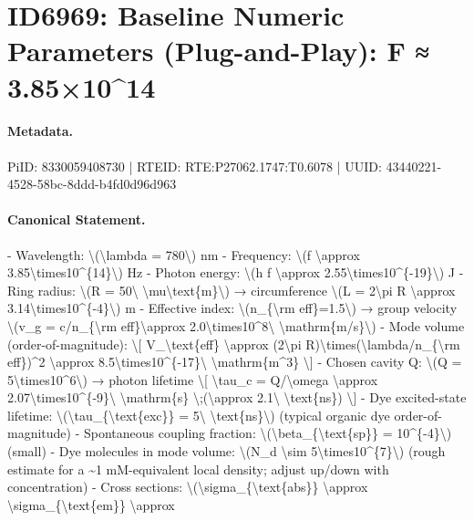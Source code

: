 \section*{ID6969: Baseline Numeric Parameters (Plug-and-Play): F ≈ 3.85×10\textasciicircum{}14}
\paragraph{Metadata.}
PiID: 8330059408730 | RTEID: RTE:P27062.1747:T0.6078 | UUID: 43440221-4528-58bc-8ddd-b4fd0d96d963

\paragraph{Canonical Statement.}
- Wavelength: \textbackslash{}(\textbackslash{}lambda = 780\textbackslash{}) nm - Frequency: \textbackslash{}(f \textbackslash{}approx 3.85\textbackslash{}times10\textasciicircum{}\{14\}\textbackslash{}) Hz - Photon energy: \textbackslash{}(h f \textbackslash{}approx 2.55\textbackslash{}times10\textasciicircum{}\{-19\}\textbackslash{}) J - Ring radius: \textbackslash{}(R = 50\textbackslash{} \textbackslash{}mu\textbackslash{}text\{m\}\textbackslash{}) → circumference \textbackslash{}(L = 2\textbackslash{}pi R \textbackslash{}approx 3.14\textbackslash{}times10\textasciicircum{}\{-4\}\textbackslash{}) m - Effective index: \textbackslash{}(n\_\{\textbackslash{}rm eff\}=1.5\textbackslash{}) → group velocity \textbackslash{}(v\_g = c/n\_\{\textbackslash{}rm eff\}\textbackslash{}approx 2.0\textbackslash{}times10\textasciicircum{}8\textbackslash{} \textbackslash{}mathrm\{m/s\}\textbackslash{}) - Mode volume (order-of-magnitude): \textbackslash{}[ V\_\textbackslash{}text\{eff\} \textbackslash{}approx (2\textbackslash{}pi R)\textbackslash{}times(\textbackslash{}lambda/n\_\{\textbackslash{}rm eff\})\textasciicircum{}2 \textbackslash{}approx 8.5\textbackslash{}times10\textasciicircum{}\{-17\}\textbackslash{} \textbackslash{}mathrm\{m\textasciicircum{}3\} \textbackslash{}] - Chosen cavity Q: \textbackslash{}(Q = 5\textbackslash{}times10\textasciicircum{}6\textbackslash{}) → photon lifetime \textbackslash{}[ \textbackslash{}tau\_c = Q/\textbackslash{}omega \textbackslash{}approx 2.07\textbackslash{}times10\textasciicircum{}\{-9\}\textbackslash{} \textbackslash{}mathrm\{s\} \textbackslash{};(\textbackslash{}approx 2.1\textbackslash{} \textbackslash{}text\{ns\}) \textbackslash{}] - Dye excited-state lifetime: \textbackslash{}(\textbackslash{}tau\_\{\textbackslash{}text\{exc\}\} = 5\textbackslash{} \textbackslash{}text\{ns\}\textbackslash{}) (typical organic dye order-of-magnitude) - Spontaneous coupling fraction: \textbackslash{}(\textbackslash{}beta\_\{\textbackslash{}text\{sp\}\} = 10\textasciicircum{}\{-4\}\textbackslash{}) (small) - Dye molecules in mode volume: \textbackslash{}(N\_d \textbackslash{}sim 5\textbackslash{}times10\textasciicircum{}\{7\}\textbackslash{}) (rough estimate for a \textasciitilde{}1 mM-equivalent local density; adjust up/down with concentration) - Cross sections: \textbackslash{}(\textbackslash{}sigma\_\{\textbackslash{}text\{abs\}\} \textbackslash{}approx \textbackslash{}sigma\_\{\textbackslash{}text\{em\}\} \textbackslash{}approx 